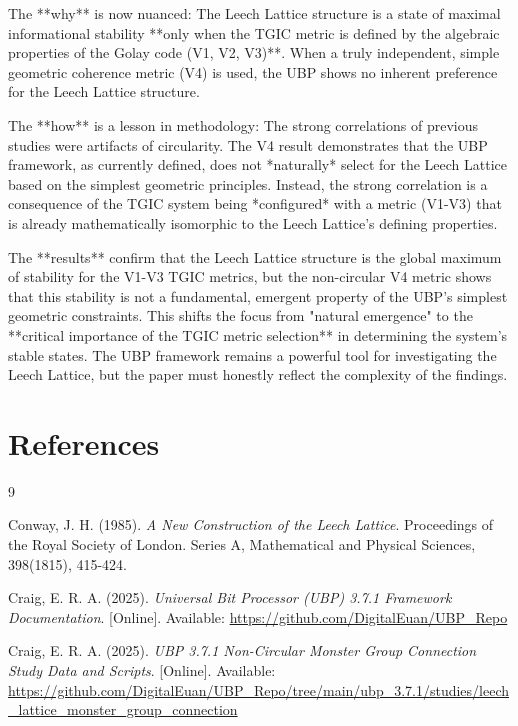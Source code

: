 \documentclass[10pt, a4paper]{article}
\begin{document}
The **why** is now nuanced: The Leech Lattice structure is a state of maximal informational stability **only when the TGIC metric is defined by the algebraic properties of the Golay code (V1, V2, V3)**. When a truly independent, simple geometric coherence metric (V4) is used, the UBP shows no inherent preference for the Leech Lattice structure.

The **how** is a lesson in methodology: The strong correlations of previous studies were artifacts of circularity. The V4 result demonstrates that the UBP framework, as currently defined, does not *naturally* select for the Leech Lattice based on the simplest geometric principles. Instead, the strong correlation is a consequence of the TGIC system being *configured* with a metric (V1-V3) that is already mathematically isomorphic to the Leech Lattice's defining properties.

The **results** confirm that the Leech Lattice structure is the global maximum of stability for the V1-V3 TGIC metrics, but the non-circular V4 metric shows that this stability is not a fundamental, emergent property of the UBP's simplest geometric constraints. This shifts the focus from "natural emergence" to the **critical importance of the TGIC metric selection** in determining the system's stable states. The UBP framework remains a powerful tool for investigating the Leech Lattice, but the paper must honestly reflect the complexity of the findings.

\section*{References}
\begin{thebibliography}{9}

Conway, J. H. (1985). \textit{A New Construction of the Leech Lattice}. Proceedings of the Royal Society of London. Series A, Mathematical and Physical Sciences, 398(1815), 415-424.

Craig, E. R. A. (2025). \textit{Universal Bit Processor (UBP) 3.7.1 Framework Documentation}. [Online]. Available: \url{https://github.com/DigitalEuan/UBP_Repo}

Craig, E. R. A. (2025). \textit{UBP 3.7.1 Non-Circular Monster Group Connection Study Data and Scripts}. [Online]. Available: \url{https://github.com/DigitalEuan/UBP_Repo/tree/main/ubp_3.7.1/studies/leech_lattice_monster_group_connection}

\end{thebibliography}
\end{document}
